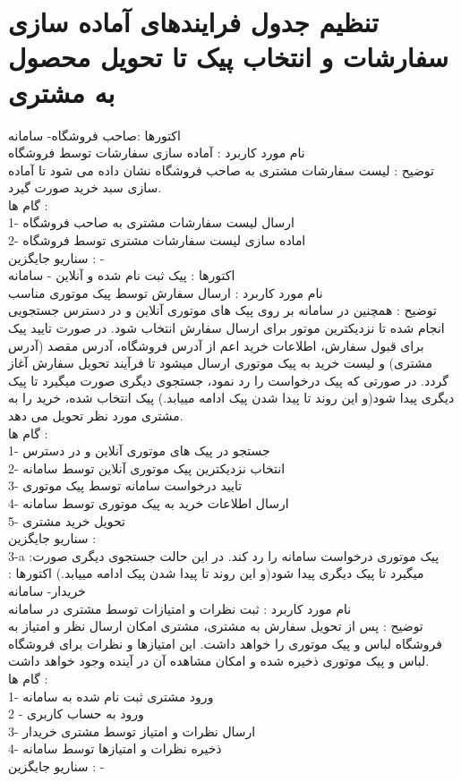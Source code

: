 \documentclass[12pt]{report}
\begin{document}
\section{تنظیم جدول فرایندهای آماده سازی سفارشات و انتخاب پیک تا تحویل محصول به مشتری}

اکتورها :صاحب فروشگاه- سامانه\\
نام مورد کاربرد : آماده سازی سفارشات توسط فروشگاه\\
توضیح : لیست سفارشات مشتری به صاحب فروشگاه نشان داده می شود تا آماده سازی سبد خرید صورت گیرد. \\
گام ها :\\
1- ارسال لیست سفارشات مشتری به صاحب فروشگاه\\
2- اماده سازی لیست سفارشات مشتری توسط فروشگاه\\
سناریو جایگزین : -\\
اکتورها : پیک ثبت نام شده و آنلاین - سامانه\\
نام مورد کاربرد : ارسال سفارش توسط پیک موتوری مناسب\\
توضیح : همچنین در سامانه بر روی پیک های موتوری آنلاین و در دسترس جستجویی انجام شده تا نزدیکترین موتور برای ارسال سفارش انتخاب شود. در صورت تایید پیک برای قبول سفارش، اطلاعات خرید اعم از آدرس فروشگاه، آدرس مقصد (آدرس مشتری) و لیست خرید به پیک موتوری ارسال میشود تا فرآیند تحویل سفارش آغاز گردد. در صورتی که پیک درخواست را رد نمود، جستجوی دیگری صورت میگیرد تا پیک دیگری پیدا شود(و این روند تا پیدا شدن پیک ادامه مییابد.) پیک انتخاب شده، خرید را به مشتری مورد نظر تحویل می دهد.\\
گام ها :\\
1- جستجو در پیک های موتوری آنلاین و در دسترس\\
2- انتخاب نزدیکترین پیک موتوری آنلاین توسط سامانه \\
3- تایید درخواست سامانه توسط پیک موتوری\\
4- ارسال اطلاعات خرید به پیک موتوری توسط سامانه\\
5- تحویل خرید مشتری\\
سناریو جایگزین : \\
3-a :پیک موتوری درخواست سامانه را رد کند. در این حالت جستجوی دیگری صورت میگیرد تا پیک دیگری پیدا شود(و این روند تا پیدا شدن پیک ادامه مییابد.)
اکتورها : خریدار- سامانه\\
نام مورد کاربرد : ثبت نظرات و امتیازات توسط مشتری در سامانه\\
توضیح : پس از تحویل سفارش به مشتری، مشتری امکان ارسال نظر و امتیاز به فروشگاه لباس و پیک موتوری را خواهد داشت. این امتیازها و نظرات برای فروشگاه لباس و پیک موتوری ذخیره شده و امکان مشاهده آن در آینده وجود خواهد داشت. \\
گام ها :\\
1-  ورود مشتری ثبت نام شده‌ به سامانه\\
2 - ورود به حساب کاربری\\
3- ارسال نظرات و امتیاز توسط مشتری خریدار\\
4- ذخیره نظرات و امتیازها توسط سامانه\\
سناریو جایگزین : -
 
\end{document}
